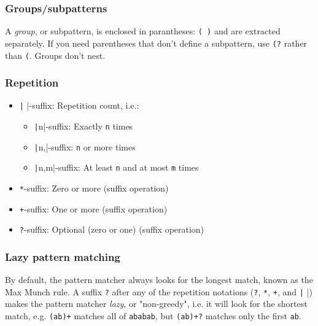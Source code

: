 \documentclass[table, xcdraw]{article}%
\begin{document}
\subsubsection{Groups/subpatterns} \label{subpatterns}

A \emph{group}, or subpattern, is enclosed in parantheses: \texttt{( )} and are extracted separately. If you need parentheses that don't define a subpattern, use \texttt{(?} rather than  \texttt{(}. Groups don't nest.

\subsubsection{Repetition}

\begin{itemize}
    \item \texttt|{ }|-suffix: Repetition count, i.e.:
    \begin{itemize}
        \item \texttt|{n}|-suffix: Exactly \texttt{n} times
        \item \texttt|{n,}|-suffix: \texttt{n} or more times
        \item \texttt|{n,m}|-suffix: At least \texttt{n} and at most \texttt{m} times
    \end{itemize}
    \item \texttt{*}-suffix: Zero or more (suffix operation)
    \item \texttt{+}-suffix: One or more (suffix operation)
    \item \texttt{?}-suffix: Optional (zero or one) (suffix operation)
\end{itemize}

\subsubsection{Lazy pattern matching}

By default, the pattern matcher always looks for the longest match, known as the Max Munch rule. A suffix \texttt{?} after any of the repetition notations (\texttt{?}, \texttt{*}, \texttt{+}, and \texttt|{ }|) makes the pattern matcher \emph{lazy}, or "non-greedy", i.e. it will look for the shortest match, e.g. \texttt{(ab)+} matches all of \texttt{ababab}, but \texttt{(ab)+?} matches only the first \texttt{ab}.
\end{document}
